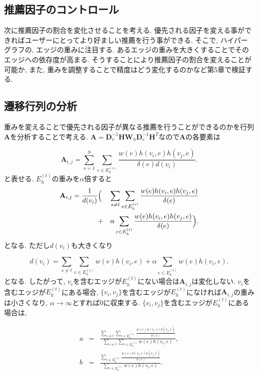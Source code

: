 \documentclass[a4j,11pt]{jarticle}           %
\begin{document}
	
	\subsection{推薦因子のコントロール}
	次に推薦因子の割合を変化させることを考える. 優先される因子を変える事ができればユーザーにとってより好ましい推薦を行う事ができる. そこで, ハイパーグラフの, エッジの重みに注目する. あるエッジの重みを大きくすることでそのエッジへの依存度が高まる. そうすることにより推薦因子の割合を変えることが可能か, また, 重みを調整することで精度はどう変化するのかなど第5章で検証する. 
	
	
	
	
	\subsection{遷移行列の分析}
	重みを変えることで優先される因子が異なる推薦を行うことができるのかを行列\textbf{A}を分析することで考える. 
	$\textbf{A}=\textbf{D}_v^{-1}\textbf{H}\textbf{W}_h\textbf{D}_e^{-1}\textbf{H}^T$なので\textbf{A}の各要素は
	
	\begin{equation}
		\textbf{A}_{i,j}=\sum_{s=1}^{S}\sum_{e\in E_h^{(s)}}\frac{w(e)h(v_i,e)h(v_j,e)}{\delta(e)d(v_i)}.
	\end{equation}
	と表せる. $E_h^{(t)}$の重みを$\alpha$倍すると
	\begin{eqnarray}
		\textbf{A}_{i,j}=\frac{1}{d(v_i)}&\Bigl(&\sum_{s\neq t}\sum_{e\in E_h^{(s)}}\frac{w(e)h(v_i,e)h(v_j,e)}{\delta(e)} \nonumber\\ &+&\alpha\sum_{e\in E_h^{(t)}}\frac{w(e)h(v_i,e)h(v_j,e)}{\delta(e)}\Bigr). 
	\end{eqnarray}	
	となる. ただし$d(v_i)$も大きくなり
	
	\begin{equation}
		d(v_i)=\sum_{s\neq t}\sum_{e\in E_h^{(s)}}w(e)h(v_i,e)+\alpha\sum_{e\in E_h^{(t)}}w(e)h(v_i,e). 
	\end{equation}
	となる. したがって, $v_i$を含むエッジが$E_h^{(t)}$にない場合は$\textbf{A}_{i,j}$は変化しない. $v_i$を含むエッジが$E_h^{(t)}$にある場合, $\{v_i, v_j\}$を含むエッジが$E_h^{(t)}$になければ$\textbf{A}_{i,j}$の重みは小さくなり, $\alpha \rightarrow \infty$とすれば0に収束する. $\{v_i, v_j\}$を含むエッジが$E_h^{(t)}$にある場合は,
	
	\begin{eqnarray}
		a &=& \frac{\sum_{s\neq t}\sum_{e\in E_h^{(s)}}\frac{w(e)h(v_i,e)h(v_j,e)}{\delta(e)}}{\sum_{s\neq t}\sum_{e\in E_h^{(s)}}w(e)h(v_i,e)}, \\
		b &=& \frac{\sum_{e\in E_h^{(t)}}\frac{w(e)h(v_i,e)h(v_j,e)}{\delta(e)}}{\sum_{e\in E_h^{(t)}}w(e)h(v_i,e)}.
	\end{eqnarray}
	
\end{document}
